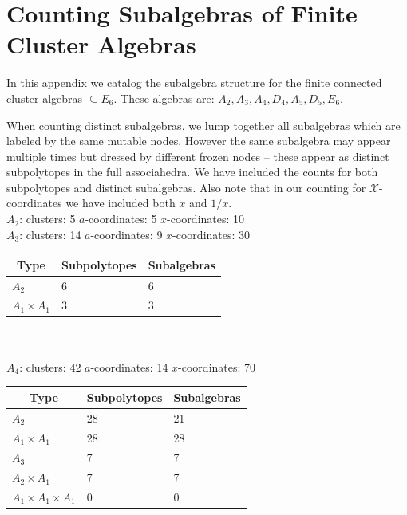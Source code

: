 \documentclass[11pt]{article}
\def\xcoords{$\mathcal{X}$-coordinates }
\begin{document}
\section{Counting Subalgebras of Finite Cluster Algebras}\label{appendix:subalgebras}
In this appendix we catalog the subalgebra structure for the finite connected cluster algebras \(\subseteq E_6\). These algebras are: \(A_2, A_3, A_4, D_4, A_5, D_5, E_6\).

When counting distinct subalgebras, we lump together all subalgebras which are labeled by the same mutable nodes. However the same subalgebra may appear multiple times but dressed by different frozen nodes -- these appear as distinct subpolytopes in the full associahedra. We have included the counts for both subpolytopes and distinct subalgebras. Also note that in our counting for \xcoords we have included both $x$ and $1/x$.\\ 

{\Large\underline{\(A_2\)}:} \quad clusters: 5 \qquad $a$-coordinates: 5 \qquad $x$-coordinates: 10 \\


{\Large\underline{\(A_3\)}:} \quad clusters: 14 \qquad \(a\)-coordinates: 9 \qquad \(x\)-coordinates: 30 \\

\begin{tabular}{ | l | l | l |}
\multicolumn{1}{c}{Type} &  \multicolumn{1}{c}{Subpolytopes}  &  \multicolumn{1}{c}{Subalgebras} \\
\hline \(A_2\) & 6 & 6 \\ 
\hline \(A_1 \times A_1\) & 3 & 3 \\ 
\hline
\end{tabular} \\ \\


{\Large \underline{\(A_4\)}:} \quad clusters: 42 \qquad \(a\)-coordinates: 14 \qquad \(x\)-coordinates: 70\\ 

\begin{tabular}{ | l | l | l |}
\multicolumn{1}{c}{Type} &  \multicolumn{1}{c}{Subpolytopes}  &  \multicolumn{1}{c}{Subalgebras} \\
\hline \(A_2\) & 28 & 21 \\ 
\hline \(A_1 \times A_1\) & 28 & 28 \\ \hline 
\hline \(A_3\) & 7 & 7 \\ 
\hline \(A_2 \times A_1\) & 7 & 7 \\ 
\hline \(A_1 \times A_1 \times A_1\) & 0 & 0 \\ 
\hline
\end{tabular} \\ \\ 
\end{document}
